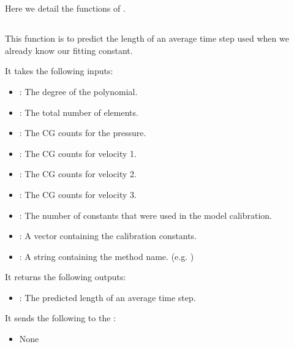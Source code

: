 
\chapter{} %

\label{Chapter3} %

Here we detail the functions of .

\section{}
This function is to predict the length of an average time step used when we already know our fitting constant. 

It takes the following inputs:

\begin{itemize}
\item {}: The degree of the polynomial.
\item {}: The total number of elements.
\item {}: The CG counts for the pressure.
\item {}: The CG counts for velocity 1.
\item {}: The CG counts for velocity 2.
\item {}: The CG counts for velocity 3.
\item {}: The number of constants that were used in the model calibration.
\item {}: A vector containing the calibration constants.
\item {}: A string containing the method name. (e.g. )

\end{itemize}

It returns the following outputs:

\begin{itemize}
\item {}: The predicted length of an average time step.
\end{itemize}

It sends the following to the :

\begin{itemize}
\item None
\end{itemize}

